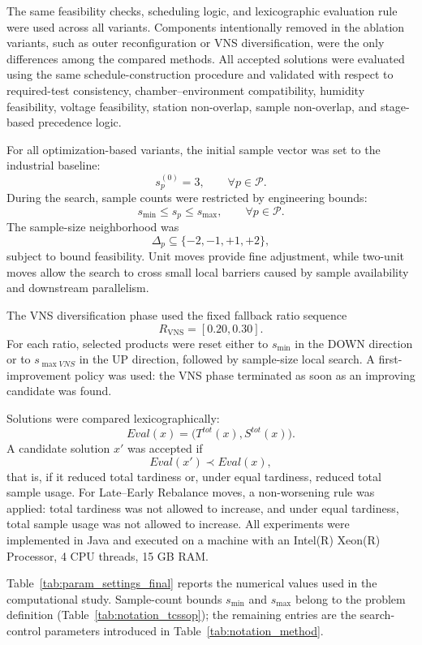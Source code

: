 \documentclass[11pt]{article}
\begin{document}
The same feasibility checks, scheduling logic, and lexicographic evaluation rule were used across all variants. Components intentionally removed in the ablation variants, such as outer reconfiguration or VNS diversification, were the only differences among the compared methods. All accepted solutions were evaluated using the same schedule-construction procedure and validated with respect to required-test consistency, chamber--environment compatibility, humidity feasibility, voltage feasibility, station non-overlap, sample non-overlap, and stage-based precedence logic.


For all optimization-based variants, the initial sample vector was set to the industrial baseline:
\[
s_p^{(0)}=3,\qquad \forall p\in\mathcal{P}.
\]
During the search, sample counts were restricted by engineering bounds:
\[
s_{\min}\le s_p\le s_{\max},\qquad \forall p\in\mathcal{P}.
\]
The sample-size neighborhood was
\[
\Delta_p\subseteq\{-2,-1,+1,+2\},
\]
subject to bound feasibility. Unit moves provide fine adjustment, while two-unit moves allow the search to cross small local barriers caused by sample availability and downstream parallelism.

The VNS diversification phase used the fixed fallback ratio sequence
\[
R_{\mathrm{VNS}}=[0.20,0.30].
\]
For each ratio, selected products were reset either to \(s_{\min}\) in the \textsc{DOWN} direction or to \(s_{\max VNS}\) in the \textsc{UP} direction, followed by sample-size local search. A first-improvement policy was used: the VNS phase terminated as soon as an improving candidate was found.

Solutions were compared lexicographically:
\[
Eval(x)=\big(T^{tot}(x),S^{tot}(x)\big).
\]
A candidate solution \(x'\) was accepted if
\[
Eval(x')\prec Eval(x),
\]
that is, if it reduced total tardiness or, under equal tardiness, reduced total sample usage. For Late--Early Rebalance moves, a non-worsening rule was applied: total tardiness was not allowed to increase, and under equal tardiness, total sample usage was not allowed to increase.
All experiments were implemented in Java and executed on a machine with an Intel(R) Xeon(R) Processor, 4 CPU threads, 15 GB RAM.

Table~\ref{tab:param_settings_final} reports the numerical values used in the computational study. Sample-count bounds \(s_{\min}\) and \(s_{\max}\) belong to the problem definition (Table~\ref{tab:notation_tcssop}); the remaining entries are the search-control parameters introduced in Table~\ref{tab:notation_method}.
\end{document}

